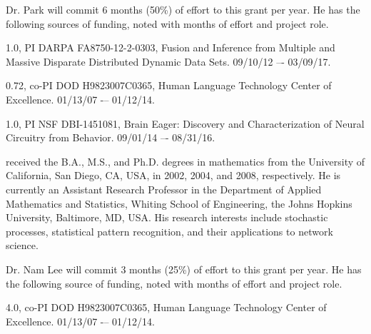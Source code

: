 
\vspace{10pt}
  Dr. Park will commit 6 months (50\%) of effort to this grant per year.  He has the following sources of funding, noted with months of effort and project role.
\small
\vspace{-5pt}
\begin{list}{[]}{\settowidth{\labelwidth}{0.72 mos., co-PI}\leftmargin{}\advance\leftmargin 0.2in \setlength{\labelsep}{0.2in}}
\addtolength{\itemsep}{-4pt}

\item[1.0, PI] DARPA FA8750-12-2-0303, Fusion and Inference from Multiple and Massive Disparate Distributed Dynamic Data Sets.  09/10/12 –- 03/09/17.

\item[0.72, co-PI] DOD H9823007C0365, Human Language Technology Center of Excellence. 01/13/07 -– 01/12/14. 

\item[1.0, PI] NSF DBI-1451081, Brain Eager: Discovery and Characterization of Neural Circuitry from Behavior. 09/01/14 –- 08/31/16.

\end{list}


  received the B.A., M.S., and Ph.D. degrees in mathematics 
from the University of California, San Diego, CA, USA, 
in 2002, 2004, and 2008, respectively.
He is currently an Assistant Research Professor  in
the Department of Applied Mathematics and Statistics, Whiting School of 
Engineering, the Johns Hopkins University, Baltimore, MD, USA. 
His research interests 
include stochastic processes, 
statistical pattern recognition, 
and their applications to network science.

\vspace{10pt}
 Dr. Nam Lee will commit 3 months (25\%) of effort to this grant per year. He has the following source of funding, noted with months of effort and project role.
\small
\vspace{-5pt}
\begin{list}{[]}{\settowidth{\labelwidth}{0.72 mos., co-PI}\leftmargin{}\advance\leftmargin 0.2in \setlength{\labelsep}{0.2in}}
\addtolength{\itemsep}{-4pt}

\item[4.0, co-PI] DOD H9823007C0365, Human Language Technology Center of Excellence. 01/13/07 -– 01/12/14. 

\end{list}


